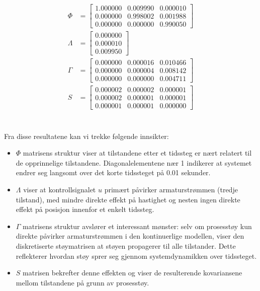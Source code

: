 \documentclass[a4paper,12pt]{article}
\theoremstyle{plain}
\begin{document}
\begin{align*}
\Phi &= \begin{bmatrix}
1.000000 & 0.009990 & 0.000010 \\
0.000000 & 0.998002 & 0.001988 \\
0.000000 & 0.000000 & 0.990050
\end{bmatrix} \\
\Lambda &= \begin{bmatrix}
0.000000 \\
0.000010 \\
0.009950
\end{bmatrix} \\
\Gamma &= \begin{bmatrix}
0.000000 & 0.000016 & 0.010466 \\
0.000000 & 0.000004 & 0.008142 \\
0.000000 & 0.000000 & 0.004711
\end{bmatrix} \\
S &= \begin{bmatrix}
0.000002 & 0.000002 & 0.000001 \\
0.000002 & 0.000001 & 0.000001 \\
0.000001 & 0.000001 & 0.000000
\end{bmatrix}
\end{align*}
\\\\
Fra disse resultatene kan vi trekke følgende innsikter:

\begin{itemize}
    \item $\Phi$ matrisens struktur viser at tilstandene etter et tidssteg er nært relatert til de opprinnelige tilstandene. Diagonalelementene nær 1 indikerer at systemet endrer seg langsomt over det korte tidssteget på 0.01 sekunder.
    
    \item $\Lambda$ viser at kontrollsignalet $u$ primært påvirker armaturstrømmen (tredje tilstand), med mindre direkte effekt på hastighet og nesten ingen direkte effekt på posisjon innenfor et enkelt tidssteg.
    
    \item $\Gamma$ matrisens struktur avslører et interessant mønster: selv om prosesstøy kun direkte påvirker armaturstrømmen i den kontinuerlige modellen, viser den diskretiserte støymatrisen at støyen propagerer til alle tilstander. Dette reflekterer hvordan støy sprer seg gjennom systemdynamikken over tidssteget.
    
    \item $S$ matrisen bekrefter denne effekten og viser de resulterende kovariansene mellom tilstandene på grunn av prosesstøy.
\end{itemize}
\end{document}
